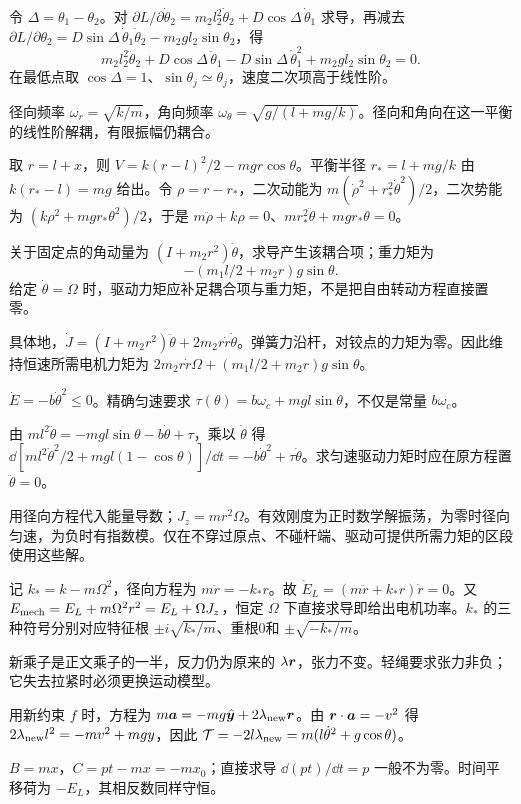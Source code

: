 \begin{bookexercises}
令 $\Delta=\theta_1-\theta_2$。对 $\partial L/\partial\dot\theta_2=m_2l_2^2\dot\theta_2+D\cos\Delta\,\dot\theta_1$ 求导，再减去 $\partial L/\partial\theta_2=D\sin\Delta\,\dot\theta_1\dot\theta_2-m_2gl_2\sin\theta_2$，得
\[
m_2l_2^2\ddot\theta_2+D\cos\Delta\,\ddot\theta_1
-D\sin\Delta\,\dot\theta_1^2+m_2gl_2\sin\theta_2=0.
\]
在最低点取 $\cos\Delta=1$、$\sin\theta_j\simeq\theta_j$，速度二次项高于线性阶。
\item 径向频率 $\omega_r=\sqrt{k/m}$，角向频率 $\omega_\theta=\sqrt{g/(l+mg/k)}$。径向和角向在这一平衡的线性阶解耦，有限振幅仍耦合。

取 $r=l+x$，则 $V=k(r-l)^2/2-mgr\cos\theta$。平衡半径 $r_*=l+mg/k$ 由 $k(r_*-l)=mg$ 给出。令 $\rho=r-r_*$，二次动能为 $m(\dot\rho^2+r_*^2\dot\theta^2)/2$，二次势能为 $(k\rho^2+mgr_*\theta^2)/2$，于是 $m\ddot\rho+k\rho=0$、$mr_*^2\ddot\theta+mgr_*\theta=0$。
\item 关于固定点的角动量为 $(I+m_2r^2)\dot\theta$，求导产生该耦合项；重力矩为
\[-(m_1l/2+m_2r)g\sin\theta.\]
给定 $\dot\theta=\Omega$ 时，驱动力矩应补足耦合项与重力矩，不是把自由转动方程直接置零。

具体地，$\dot J=(I+m_2r^2)\ddot\theta+2m_2r\dot r\dot\theta$。弹簧力沿杆，对铰点的力矩为零。因此维持恒速所需电机力矩为 $2m_2r\dot r\Omega+(m_1l/2+m_2r)g\sin\theta$。
\item $\dot E=-b\dot\theta^2\le0$。精确匀速要求 $\tau(\theta)=b\omega_c+mgl\sin\theta$，不仅是常量 $b\omega_c$。

由 $ml^2\ddot\theta=-mgl\sin\theta-b\dot\theta+\tau$，乘以 $\dot\theta$ 得 $\dd[ml^2\dot\theta^2/2+mgl(1-\cos\theta)]/\dd t=-b\dot\theta^2+\tau\dot\theta$。求匀速驱动力矩时应在原方程置 $\ddot\theta=0$。
\item 用径向方程代入能量导数；$J_z=mr^2\Omega$。有效刚度为正时数学解振荡，为零时径向匀速，为负时有指数模。仅在不穿过原点、不碰杆端、驱动可提供所需力矩的区段使用这些解。

记 $k_*=k-m\Omega^2$，径向方程为 $m\ddot r=-k_*r$。故 $\dot E_L=(m\ddot r+k_*r)\dot r=0$。又 $E_{\rm mech}=E_L+m\Omega^2r^2=E_L+\Omega J_z$，恒定 $\Omega$ 下直接求导即给出电机功率。$k_*$ 的三种符号分别对应特征根 $\pm i\sqrt{k_*/m}$、重根0和 $\pm\sqrt{-k_*/m}$。
\item 新乘子是正文乘子的一半，反力仍为原来的 $\lambda\boldsymbol{r}$，张力不变。轻绳要求张力非负；它失去拉紧时必须更换运动模型。

用新约束 $f$ 时，方程为 $m\boldsymbol{a}=-mg\hat{\boldsymbol y}+2\lambda_{\rm new}\boldsymbol{r}$。由 $\boldsymbol{r}\cdot\boldsymbol{a}=-v^2$ 得 $2\lambda_{\rm new}l^2=-mv^2+mgy$，因此 $\mathcal T=-2l\lambda_{\rm new}=m(l\dot\theta^2+g\cos\theta)$。
\item $B=mx$，$C=pt-mx=-mx_0$；直接求导 $\dd(pt)/\dd t=p$ 一般不为零。时间平移荷为 $-E_L$，其相反数同样守恒。


\end{bookexercises}
